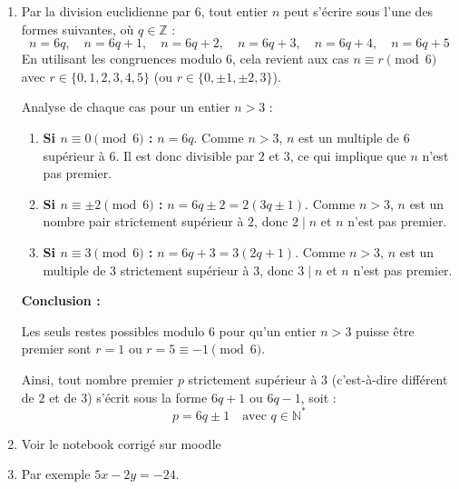 \begin{enumerate}[label=\thechapter.\arabic*, font=\bfseries, itemsep=7mm,labelsep*=3mm,left=0mm]
Par conséquent, l'hypothèse selon laquelle $\sqrt{p}$ est rationnel est fausse.

\textbf{$\sqrt{p}$ est donc irrationnel.}

\item 
Par la division euclidienne par $6$, tout entier $n$ peut s'écrire sous l'une des formes suivantes, où $q \in \mathbb{Z}$ :
\[
n = 6q, \quad n = 6q+1, \quad n = 6q+2, \quad n = 6q+3, \quad n = 6q+4, \quad n = 6q+5
\]
En utilisant les congruences modulo $6$, cela revient aux cas $n \equiv r \pmod 6$ avec $r \in \{0, 1, 2, 3, 4, 5\}$ (ou $r \in \{0, \pm 1, \pm 2, 3\}$).

Analyse de chaque cas pour un entier $n > 3$ :

\begin{enumerate}
	\item \textbf{Si $n \equiv 0 \pmod 6$ :} $n = 6q$. Comme $n > 3$, $n$ est un multiple de $6$ supérieur à $6$. Il est donc divisible par $2$ et $3$, ce qui implique que $n$ n'est pas premier.
	
	\item \textbf{Si $n \equiv \pm 2 \pmod 6$ :} $n = 6q \pm 2 = 2(3q \pm 1)$. Comme $n > 3$, $n$ est un nombre pair strictement supérieur à $2$, donc $2 \mid n$ et $n$ n'est pas premier.
	
	\item \textbf{Si $n \equiv 3 \pmod 6$ :} $n = 6q + 3 = 3(2q + 1)$. Comme $n > 3$, $n$ est un multiple de $3$ strictement supérieur à $3$, donc $3 \mid n$ et $n$ n'est pas premier.
\end{enumerate}

\textbf{Conclusion :}

Les seuls restes possibles modulo $6$ pour qu'un entier $n > 3$ puisse être premier sont $r = 1$ ou $r = 5 \equiv -1 \pmod 6$.

Ainsi, tout nombre premier $p$ strictement supérieur à $3$ (c'est-à-dire différent de $2$ et de $3$) s'écrit sous la forme $6q + 1$ ou $6q - 1$, soit :
\[
p = 6q \pm 1 \quad \text{avec } q \in \mathbb{N}^* 
\]




\item Voir le notebook corrigé sur moodle

\item
Par exemple $5x-2y=-24$.


\end{enumerate}
